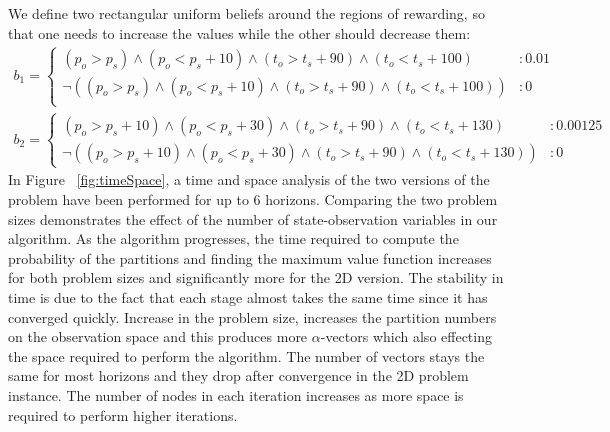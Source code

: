 \documentclass{article} %
\begin{document}
We define two rectangular uniform beliefs around the regions of rewarding, so that one needs to increase the values while the other should decrease them: 
\begin{align}
b_1 = 
\begin{cases}
(p_o>p_s) \wedge (p_o<p_s+10) \wedge (t_o>t_s+ 90) \wedge (t_o<t_s+ 100)&: 0.01 \\
 \neg( (p_o>p_s) \wedge (p_o<p_s+10) \wedge (t_o>t_s+ 90) \wedge (t_o<t_s+ 100)) &: 0 \\
\end{cases}\nonumber
\end{align}
\begin{align}
b_2 = 
\begin{cases}
(p_o>p_s +10) \wedge (p_o<p_s+30) \wedge (t_o>t_s+ 90) \wedge (t_o<t_s+ 130)&: 0.00125 \\
 \neg((p_o>p_s +10) \wedge (p_o<p_s+30) \wedge (t_o>t_s+ 90) \wedge (t_o<t_s+ 130)) &: 0 
\end{cases}\nonumber
\end{align}
In Figure ~\ref{fig:timeSpace}, a time and space analysis of
the two versions of the problem have been performed for up to 6 horizons. Comparing the two problem sizes demonstrates the effect of the number of state-observation variables in our algorithm. As the algorithm progresses, the time required to compute the probability of the partitions and finding the maximum value function increases for both problem sizes and significantly more for the 2D version. The stability in time is due to the fact that each stage almost takes the same time since it has converged quickly.%
Increase in the problem size, increases the partition numbers on the observation space and this produces more $\alpha$-vectors which also effecting the space required to perform the algorithm. The number of vectors stays the same for most horizons and they drop after convergence in the 2D problem instance. The number of nodes in each iteration increases as more space is required to perform higher iterations. 
\end{document}
